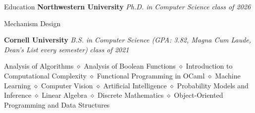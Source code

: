 \documentclass{resume} %
\date{\specialdate\today}
\begin{document}






\begin{rSection}{Education}
{\bf Northwestern University} \textit{Ph.D. in Computer Science}  \hfill {\em class of 2026}
\item Mechanism Design

{\bf Cornell University} \textit{B.S. in Computer Science (GPA: 3.82, Magna Cum Laude, Dean's List every semester)}  \hfill {\em class of 2021}
\item Analysis of Algorithms  $\diamond$ Analysis of Boolean Functions $\diamond$ Introduction to Computational Complexity $\diamond$ Functional Programming in OCaml $\diamond$ Machine Learning $\diamond$ Computer Vision $\diamond$ Artificial Intelligence $\diamond$ Probability Models and Inference $\diamond$ Linear Algebra $\diamond$ Discrete Mathematics $\diamond$ Object-Oriented Programming and Data Structures

\end{rSection}




\end{document}
